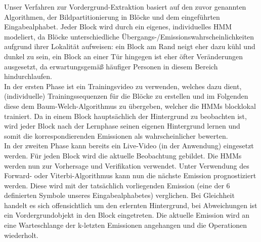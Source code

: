 Unser Verfahren zur Vordergrund-Extraktion basiert auf den zuvor genannten  Algorithmen, der Bildpartitionierung in Blöcke und dem eingeführten Eingabealphabet.
Jeder Block wird durch ein eigenes, individuelles HMM modeliert, da Blöcke unterschiedliche Übergangs-/Emissionswahrscheinlichkeiten aufgrund ihrer Lokalität aufweisen: ein Block am Rand neigt eher dazu kühl und dunkel zu sein, ein Block an einer Tür hingegen ist eher öfter Veränderungen ausgesetzt, da erwartungsgemäß häufiger Personen in diesem Bereich hindurchlaufen.\\
In der ersten Phase ist ein Trainingsvideo zu verwenden, welches dazu dient, (individuelle) Trainingssequenzen für die Blöcke zu erstellen und im Folgenden diese dem Baum-Welch-Algorithmus zu übergeben, welcher die HMMs blocklokal trainiert.
Da in einem Block hauptsächlich der Hintergrund zu beobachten ist, wird jeder Block nach der Lernphase seinen eigenen Hintergrund lernen und somit die korrespondierenden Emissionen als wahrscheinlicher bewerten.\\
In der zweiten Phase kann bereits ein Live-Video (in der Anwendung) eingesetzt werden.
Für jeden Block wird die aktuelle Beobachtung gebildet.
Die HMMs werden nun zur Vorhersage und Verifikation verwendet.
Unter Verwendung des Forward- oder Viterbi-Algorithmus kann nun die nächste Emission prognostiziert werden.
Diese wird mit der tatsächlich vorliegenden Emission (eine der 6 definierten Symbole unseres Eingabealphabetes) verglichen.
Bei Gleichheit handelt es sich offensichtlich um den erlernten Hintergrund, bei Abweichungen ist ein Vordergrundobjekt in den Block eingetreten.
Die aktuelle Emission wird an eine Warteschlange der k-letzten Emissionen angehangen und die Operationen wiederholt.

%
%
%
%
%
%
%
